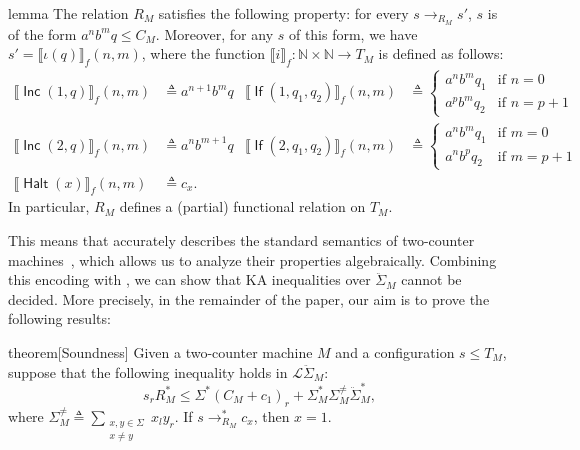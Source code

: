 \documentclass[a4paper,UKenglish,cleveref, autoref, thm-restate]{lipics-v2021}
\DeclareMathOperator{\Inc}{\mathsf{Inc}}
\DeclareMathOperator{\If}{\mathsf{If}}
\DeclareMathOperator{\Halt}{\mathsf{Halt}}
\begin{document}
\begin{theoremEnd}{lemma}
  The relation $R_M$ satisfies the following property: for every
  $s \to _{R_M} s'$, $s$ is of the form $a^nb^mq \leq C_M$.  Moreover, for any
  $s$ of this form, we have $s' = \llbracket \iota (q) \rrbracket_f (n,m)$, where the
  function $ \llbracket i \rrbracket_f : \mathbb{N} \times \mathbb{N} \to T_M$ is
  defined as follows:
  \begin{align*}
     \llbracket \Inc(1,q) \rrbracket_f (n, m) &  \triangleq  a^{n+1}b^mq &
     \llbracket \If(1,q_{1},q_{2}) \rrbracket_f (n, m) &  \triangleq  \begin{cases}
      a^nb^mq_{1} & \text{if $n = 0$} \\
      a^pb^mq_{2} & \text{if $n = p+1$}
    \end{cases} \\
     \llbracket \Inc(2,q) \rrbracket_f (n, m) &  \triangleq  a^nb^{m+1}q &
     \llbracket \If(2,q_{1},q_{2}) \rrbracket_f (n, m) &  \triangleq  \begin{cases}
      a^nb^mq_{1} & \text{if $m = 0$} \\
      a^nb^pq_{2} & \text{if $m = p+1$}
    \end{cases} \\
     \llbracket \Halt(x) \rrbracket_f (n,m) &  \triangleq  c_x.
  \end{align*}
  In particular, $R_M$ defines a (partial) functional relation on $T_M$.
\end{theoremEnd}

This means that  accurately describes the
standard semantics of two-counter machines~\cite{Hopcroft2001}, which allows us
to analyze their properties algebraically.  Combining this encoding with
, we can show that KA inequalities over
\(\ddot{ \Sigma }_M\) cannot be decided.  More precisely, in the remainder of
the paper, our aim is to prove the following results:

\begin{theoremEnd}{theorem}[Soundness]
  \label{thm:soundness}
  Given a two-counter machine $M$ and a configuration $s  \leq  T_M$, suppose that
  the following inequality holds in $\mathcal{L}\ddot{ \Sigma }_M$:
  \[ s_rR_M^*  \leq   \Sigma ^*(C_M + c_1)_r +  \Sigma _M^* \Sigma _M^{ \neq }\ddot{ \Sigma }_M^*, \] where
  \(
     \Sigma ^{ \neq }_M  \triangleq   \sum _{\substack{x, y  \in   \Sigma  \\ x  \neq  y}} x_ly_r.
  \)
  If $s  \to _{R_M}^* c_x$, then $x = 1$.
\end{theoremEnd}
\end{document}
